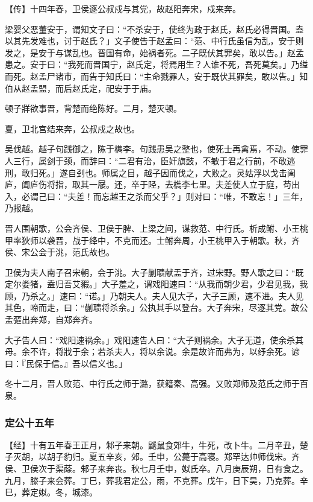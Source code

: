 \documentclass[]{article}
\begin{document}
【传】十四年春，卫侯逐公叔戍与其党，故赵阳奔宋，戍来奔。

梁婴父恶董安于，谓知文子曰：``不杀安于，使终为政于赵氏，赵氏必得晋国。盍以其先发难也，讨于赵氏？」文子使告于赵孟曰：``范、中行氏虽信为乱，安于则发之，是安于与谋乱也。晋国有命，始祸者死。二子既伏其罪矣，敢以告。」赵孟患之。安于曰：``我死而晋国宁，赵氏定，将焉用生？人谁不死，吾死莫矣。」乃缢而死。赵孟尸诸市，而告于知氏曰：``主命戮罪人，安于既伏其罪矣，敢以告。」知伯从赵孟盟，而后赵氏定，祀安于于庙。

顿子牂欲事晋，背楚而绝陈好。二月，楚灭顿。

夏，卫北宫结来奔，公叔戍之故也。

吴伐越。越子句践御之，陈于檇李。句践患吴之整也，使死士再禽焉，不动。使罪人三行，属剑于颈，而辞曰：``二君有治，臣奸旗鼓，不敏于君之行前，不敢逃刑，敢归死。」遂自刭也。师属之目，越子因而伐之，大败之。灵姑浮以戈击阖庐，阖庐伤将指，取其一屦。还，卒于陉，去檇李七里。夫差使人立于庭，苟出入，必谓己曰：``夫差！而忘越王之杀而父乎？」则对曰：``唯，不敢忘！」三年，乃报越。

晋人围朝歌，公会齐侯、卫侯于脾、上梁之间，谋救范、中行氏。析成鲋、小王桃甲率狄师以袭晋，战于绛中，不克而还。士鲋奔周，小王桃甲入于朝歌。秋，齐侯、宋公会于洮，范氏故也。

卫侯为夫人南子召宋朝，会于洮。大子蒯聩献盂于齐，过宋野。野人歌之曰：``既定尔娄猪，盍归吾艾豭。」大子羞之，谓戏阳速曰：``从我而朝少君，少君见我，我顾，乃杀之。」速曰：``诺。」乃朝夫人。夫人见大子，大子三顾，速不进。夫人见其色，啼而走，曰：``蒯聩将杀余。」公执其手以登台。大子奔宋，尽逐其党。故公孟彄出奔郑，自郑奔齐。

大子告人曰：``戏阳速祸余。」戏阳速告人曰：``大子则祸余。大子无道，使余杀其母。余不许，将戕于余；若杀夫人，将以余说。余是故许而弗为，以纾余死。谚曰：『民保于信。』吾以信义也。」

冬十二月，晋人败范、中行氏之师于潞，获籍秦、高强。又败郑师及范氏之师于百泉。

\hypertarget{header-n3031}{%
\subsubsection{定公十五年}\label{header-n3031}}

【经】十有五年春王正月，邾子来朝。鼷鼠食郊牛，牛死，改卜牛。二月辛丑，楚子灭胡，以胡子豹归。夏五辛亥，郊。壬申，公薨于高寝。郑罕达帅师伐宋。齐侯、卫侯次于渠蒢。邾子来奔丧。秋七月壬申，姒氏卒。八月庚辰朔，日有食之。九月，滕子来会葬。丁巳，葬我君定公，雨，不克葬。戊午，日下昊，乃克葬。辛巳，葬定姒。冬，城漆。
\end{document}
